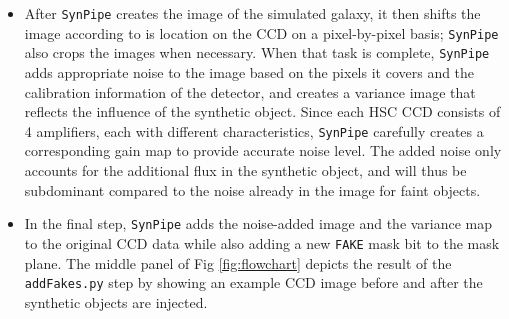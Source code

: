 \documentclass[useamsfonts]{pasj01}
\def\ser{{S\'{e}rsic\ }}
\def\synpipe{\texttt{SynPipe}}
\def\galsim{\texttt{G}{\scriptsize \texttt{AL}}\texttt{S}{\scriptsize \texttt{IM}}}
\begin{document}
\begin{itemize}
\begin{itemize}
            \item To inject real HST galaxy images, \synpipe{} calls the \galsim{}    
                \texttt{.RealGalaxy} method.
            
            \end{itemize}

        If necessary, an additional shear ($g_1$ and $g_2$) can be applied to the 
        model at this point.
        Then, \synpipe{} passes the reconstructed PSF image into a
        \galsim{}\texttt{InterpolatedImage} object and convolves it with the galaxy 
        model using \galsim{}\texttt{.Convolve}.
        After this, \synpipe{} uses the \galsim{}\texttt{.drawImage} method to redner 
        the image of the simulated galaxy.
        A component with a high \ser{} index ($n_{\mathrm{Ser}} > 4$) often requires 
        a large image size to cover all of its flux, so \synpipe{} allows the user 
        to truncate the model at a given radius (N$\times R_{\mathrm{e}}$).
        \synpipe{} will also give warning information when a component with $
        n_{\mathrm{Ser}} > 6$ is encountered because it takes much longer to achieve
        accurate PSF convolution in such a model; and the result is, therefore,
        not a realistic galaxy model.
        
        \item After \synpipe{} creates the image of the simulated galaxy, it then 
            shifts the image according to is location on the CCD on a pixel-by-pixel 
            basis; \synpipe{} also crops the images when necessary.
            When that task is complete, \synpipe{} adds appropriate noise to the 
            image based on the pixels it covers and the calibration information of 
            the detector, and creates a variance image that reflects the influence 
            of the synthetic object.
            Since each HSC CCD consists of 4 amplifiers, each with different 
            characteristics, \synpipe{} carefully creates a corresponding gain map 
            to provide accurate noise level.
            The added noise only accounts for the additional flux in the synthetic 
            object, and will thus be subdominant compared to the noise already in 
            the image for faint objects.
            
        \item In the final step, \synpipe{} adds the noise-added image and the 
            variance map to the original CCD data while also adding a new 
            \texttt{FAKE} mask bit to the mask plane.
            The middle panel of Fig \ref{fig:flowchart} depicts the result of the
            \texttt{addFakes.py} step by showing an example CCD image before and 
            after the synthetic objects are injected.
    
    \end{itemize}
\end{document}
